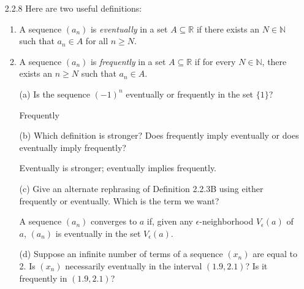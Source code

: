 \documentclass[12pt,letterpaper]{article}
\begin{document}
\begin{itemize}[leftmargin=!,labelindent=5pt]
\begin{itemize}
                A sequence $(a_n)$ “converges to infinity” if, for every positive number $\epsilon$, there exists an $N \in \mathbb{N}$ such that whenever $n \geq N$ it follows that $a_n > \epsilon$.
                
                \begin{proof}
                    Let $\epsilon > 0$ be arbitrary. Choose $N \in \mathbb{N}$ with $N > \epsilon^2$. To verify let $n \geq N$ which means $\sqrt{n} > \sqrt{\epsilon^2} = \epsilon$ as desired.
                \end{proof}
            \item [(b)] What does your definition in (a) say about the particular sequence $(1,0,2,0,3,0,4,0,5,0,...)$?
            
            It does not converge to infinity.
        \end{itemize}
    \item [2.2.8] Here are two useful definitions:
        \begin{enumerate}
            \item A sequence $(a_n)$ is \textit{eventually} in a set $A \subseteq \mathbb{R}$ if there exists an $N \in \mathbb{N}$ such that $a_n \in A$ for all $n \geq N$.
            \item A sequence $(a_n)$ is \textit{frequently} in a set $A \subseteq \mathbb{R}$ if for every $N \in \mathbb{N}$, there exists an $n \geq N$ such that $a_n \in A$.
        \end{enumerate}
        \begin{itemize}
            \item [(a)] Is the sequence $(-1)^n$ eventually or frequently in the set $\{1\}$?
            
            Frequently
            \item [(b)] Which definition is stronger? Does frequently imply eventually or does eventually imply frequently?
            
            Eventually is stronger; eventually implies frequently.
            \item [(c)] Give an alternate rephrasing of Definition 2.2.3B using either frequently or eventually. Which is the term we want?
            
            A sequence $(a_n)$ converges to $a$ if, given any $\epsilon$-neighborhood $V_\epsilon(a)$ of $a$, $(a_n)$ is eventually in the set $V_\epsilon(a)$.
            \item [(d)] Suppose an infinite number of terms of a sequence $(x_n)$ are equal to 2. Is $(x_n)$ necessarily eventually in the interval $(1.9, 2.1)$? Is it frequently in $(1.9, 2.1)$?
            

\end{itemize}
\end{itemize}
\end{document}
